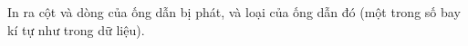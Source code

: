 In ra cột và dòng của ống dẫn bị phát, và loại của ống dẫn đó (một trong số bay kí tự như trong dữ liệu).